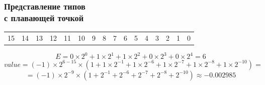 \documentclass[compress, 8pt, aspectratio=169]{beamer}
\newenvironment{sixteenbit}{%
    \begin{center}
        \begin{tabular}{ |m{0.2cm}|m{0.2cm}|m{0.2cm}|m{0.2cm}|m{0.2cm}|m{0.2cm}|m{0.2cm}|m{0.2cm}|m{0.2cm}|m{0.2cm}|m{0.2cm}|m{0.2cm}|m{0.2cm}|m{0.2cm}|m{0.2cm}|m{0.2cm}|  }
            \hline
}{
        \hline
        \multicolumn{1}{c}{\color{gray}\tiny{15}} &
        \multicolumn{1}{c}{\color{gray}\tiny{14}} &
        \multicolumn{1}{c}{\color{gray}\tiny{13}} &
        \multicolumn{1}{c}{\color{gray}\tiny{12}} &
        \multicolumn{1}{c}{\color{gray}\tiny{11}} &
        \multicolumn{1}{c}{\color{gray}\tiny{10}} &
        \multicolumn{1}{c}{\color{gray}\tiny{9}} &
        \multicolumn{1}{c}{\color{gray}\tiny{8}} &
        \multicolumn{1}{c}{\color{gray}\tiny{7}} &
        \multicolumn{1}{c}{\color{gray}\tiny{6}} &
        \multicolumn{1}{c}{\color{gray}\tiny{5}} &
        \multicolumn{1}{c}{\color{gray}\tiny{4}} &
        \multicolumn{1}{c}{\color{gray}\tiny{3}} &
        \multicolumn{1}{c}{\color{gray}\tiny{2}} &
        \multicolumn{1}{c}{\color{gray}\tiny{1}} &
        \multicolumn{1}{c}{\color{gray}\tiny{0}} \\
        \end{tabular}
    \end{center}
}
\begin{document}
\begin{frame}[fragile]

    \frametitle{Представление типов \\ с плавающей точкой}

    \begin{sixteenbit}
        \cellcolor{blue!40!white}{1} &
        \cellcolor{green!40!white}{0} &
        \cellcolor{green!40!white}{0} &
        \cellcolor{green!40!white}{1} &
        \cellcolor{green!40!white}{1} &
        \cellcolor{green!40!white}{0} &
        \cellcolor{red!40!white}{1} &
        \cellcolor{red!40!white}{0} &
        \cellcolor{red!40!white}{0} &
        \cellcolor{red!40!white}{0} &
        \cellcolor{red!40!white}{0} &
        \cellcolor{red!40!white}{1} &
        \cellcolor{red!40!white}{1} &
        \cellcolor{red!40!white}{1} &
        \cellcolor{red!40!white}{0} &
        \cellcolor{red!40!white}{1} \\
    \end{sixteenbit}

    \begin{displaymath}
        E =
            0 \times 2^0 +
            1 \times 2^1 +
            1 \times 2^2 +
            0 \times 2^3 +
            0 \times 2^4 =
            6
    \end{displaymath}
    \begin{displaymath}
        value = (-1) \times 2^{6-15} \times (
            1 +
            1 \times 2^{-1} +
            1 \times 2^{-6} +
            1 \times 2^{-7} +
            1 \times 2^{-8} +
            1 \times 2^{-10}
        ) =
    \end{displaymath}
    \begin{displaymath}
        = (-1) \times 2^{-9} \times (
            1 +
            2^{-1} +
            2^{-6} +
            2^{-7} +
            2^{-8} +
            2^{-10}
        ) \approx -0.002985
    \end{displaymath}

\end{frame}
\end{document}

